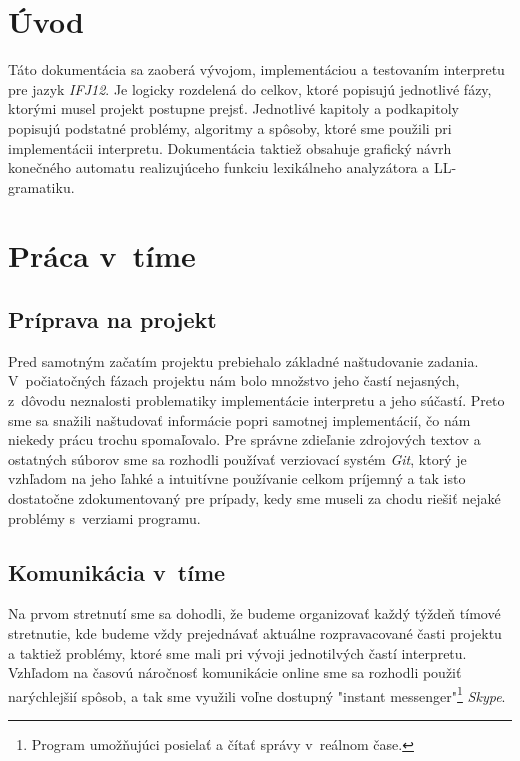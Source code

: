 \documentclass[12pt,a4paper,titlepage,final]{article}
\begin{document}


\tableofcontents
\newpage

\section{Úvod}
Táto dokumentácia sa zaoberá vývojom, implementáciou a testovaním interpretu pre jazyk \emph{IFJ12}. Je logicky rozdelená do celkov, ktoré popisujú jednotlivé fázy, ktorými musel projekt postupne prejsť. Jednotlivé kapitoly a podkapitoly popisujú podstatné problémy, algoritmy a spôsoby, ktoré sme použili pri implementácii interpretu. Dokumentácia taktiež obsahuje grafický návrh konečného automatu realizujúceho funkciu lexikálneho analyzátora a LL-gramatiku.

\section{Práca v~tíme}
\subsection{Príprava na projekt}
Pred samotným začatím projektu prebiehalo základné naštudovanie zadania. V~počiatočných fázach projektu nám bolo množstvo jeho častí nejasných, z~dôvodu neznalosti problematiky implementácie interpretu a jeho súčastí. Preto sme sa snažili naštudovať informácie popri  samotnej implementácií, čo nám niekedy prácu trochu spomaľovalo. Pre správne zdieľanie zdrojových textov a ostatných súborov sme sa rozhodli používať verziovací systém \emph{Git}, ktorý je vzhľadom na jeho ľahké a intuitívne používanie celkom príjemný a tak isto dostatočne zdokumentovaný pre prípady, kedy sme museli za chodu riešiť nejaké problémy s~verziami programu.
\subsection{Komunikácia v~tíme}
Na prvom stretnutí sme sa dohodli, že budeme organizovať každý týždeň tímové stretnutie, kde budeme vždy prejednávať aktuálne rozpravacované časti projektu a taktiež problémy, ktoré sme mali pri vývoji jednotilvých častí interpretu. Vzhľadom na časovú náročnosť komunikácie online sme sa rozhodli použiť narýchlejšií spôsob, a tak sme využili voľne dostupný "instant messenger"\footnote{Program umožňujúci posielať a čítať správy v~reálnom čase.} \emph{Skype}.
\end{document}
